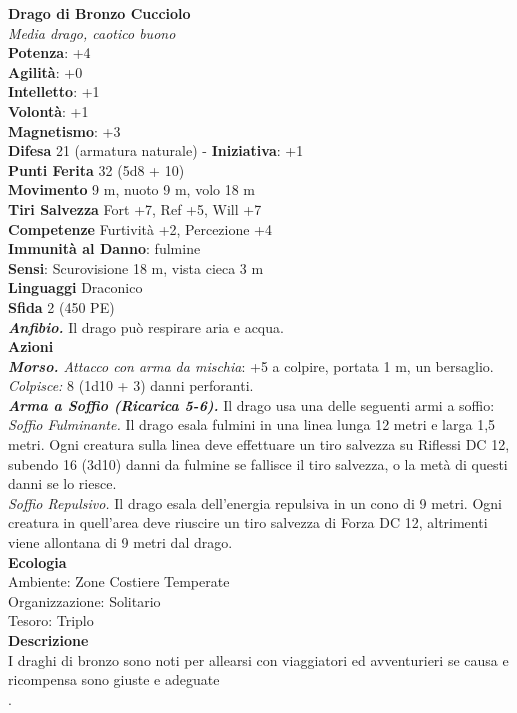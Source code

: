 \begin{multicols}{2}
\medskip\textbf{Drago di Bronzo Cucciolo}\\
\emph{Media drago, caotico buono}\\
\textbf{Potenza}: +4\\
\textbf{Agilità}: +0\\
\textbf{Intelletto}: +1\\
\textbf{Volontà}: +1\\
\textbf{Magnetismo}: +3\\
\textbf{Difesa} 21 (armatura naturale) - \textbf{Iniziativa}: +1\\
\textbf{Punti Ferita} 32 (5d8 + 10)\\
\textbf{Movimento} 9 m, nuoto 9 m, volo 18 m\\
\textbf{Tiri Salvezza} Fort +7, Ref +5, Will +7\\
\textbf{Competenze} Furtività +2, Percezione +4\\
\textbf{Immunità al Danno}: fulmine\\
\textbf{Sensi}: Scurovisione 18 m, vista cieca 3 m\\
\textbf{Linguaggi} Draconico\\
\textbf{Sfida} 2 (450 PE)\smallskip\\
\emph{\textbf{Anfibio.}} Il drago può respirare aria e acqua.\\
\smallskip\textbf{Azioni}\\
\emph{\textbf{Morso.} Attacco con arma da mischia}: +5 a colpire, portata 1 m, un bersaglio.\\
\emph{Colpisce:} 8 (1d10 + 3) danni perforanti.\\
\emph{\textbf{Arma a Soffio (Ricarica 5-6).}} Il drago usa una delle seguenti armi a soffio:\\
\emph{Soffio Fulminante.} Il drago esala fulmini in una linea lunga 12 metri e larga 1,5 metri. Ogni creatura sulla linea deve effettuare un tiro salvezza su Riflessi DC 12, subendo 16 (3d10) danni da fulmine se fallisce il tiro salvezza, o la metà di questi danni se lo riesce.\\
\emph{Soffio Repulsivo.} Il drago esala dell'energia repulsiva in un cono di 9 metri. Ogni creatura in quell'area deve riuscire un tiro salvezza di Forza DC 12, altrimenti viene allontana di 9 metri dal drago.\\
\textbf{Ecologia}\\
Ambiente: Zone Costiere Temperate\\
Organizzazione: Solitario\\
Tesoro: Triplo\\
\textbf{Descrizione}\\
I draghi di bronzo sono noti per allearsi con viaggiatori ed avventurieri se causa e ricompensa sono giuste e adeguate\\
.


\end{multicols}
